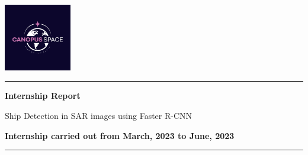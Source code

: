 \begin{sloppypar}
\pagestyle{empty}

\newcommand\titleofdoc{\bfseries Internship Report}

\newcommand\GroupName{Group Name} 
\begin{titlepage}
   \begin{center}
        \vspace*{2cm} %
        {\includegraphics[width=0.22\textwidth]{images/logo/canopus-space.jpg} \quad }

        \noindent\rule[0.25\baselineskip]{\textwidth}{1pt}
        
        \vspace{0.5 cm} 

        \Huge{\titleofdoc} 

        \vspace{0.5cm}
        \LARGE{Ship Detection in SAR images using Faster R-CNN}
          
        \vspace{2 cm}
        \vspace{0.25cm}
        \large{\bfseries Internship carried out from March, 2023  to June, 2023}\\
        \vspace{4 cm}
         

        \vspace{1 cm}
        
        \noindent\rule[0.25\baselineskip]{\textwidth}{1pt}\\
    \end{center}
\setcounter{page}{0}
\end{titlepage}

\restoregeometry



\end{sloppypar}
